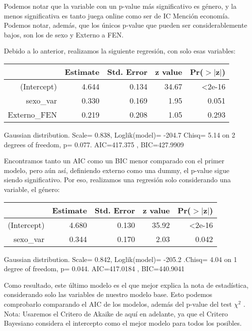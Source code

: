 \documentclass[11pt]{article}
\begin{document}
Podemos notar que la variable con un p-value más significativo es género, y la menos significativa es tanto juega online como ser de IC Mención economía. Podemos notar, además, que los únicos p-value que pueden ser considerablemente bajos, son los de sexo y Externo a FEN.

Debido a lo anterior, realizamos la siguiente regresión, con solo esas variables:

\begin{center}
\begin{table}[ht]
\centering
\begin{tabular}{rrrrr}
 \hline
& Estimate & Std. Error & z value & Pr($>$$|$z$|$) \\
 \hline
(Intercept)  & 4.644      & 0.134  & 34.67  &<2e-16\\ 
    sexo\_var &   0.330 & 0.169 & 1.95 & 0.051\\
    Externo\_FEN & 0.219  & 0.208 & 1.05 & 0.293\\
 
    \hline
   \end{tabular}
   \end{table}
\tiny{Gaussian distribution. Scale= 0.838, Loglik(model)= -204.7 Chisq= 5.14 on 2 degrees of freedom, p= 0.077. AIC=417.375 , BIC=427.9909}
\end{center}  

Encontramos tanto un AIC como un BIC menor comparado con el primer modelo, pero aún así, definiendo externo como una dummy, el p-value sigue siendo significativo. Por eso, realizamos una regresión solo considerando una variable, el género:

\begin{center}
\begin{table}[ht]
\centering
\begin{tabular}{rrrrr}
 \hline
& Estimate & Std. Error & z value & Pr($>$$|$z$|$) \\
 \hline
(Intercept)  & 4.680      & 0.130  & 35.92  &<2e-16\\ 
    sexo\_var &   0.344 & 0.170 & 2.03 & 0.042\\
               
    \hline
   \end{tabular}
   \end{table}
\tiny{Gaussian distribution. Scale= 0.842, Loglik(model)= -205.2 .Chisq= 4.04 on 1 degree of freedom, p= 0.044. AIC=417.0184 , BIC=440.9041}
\end{center}   

Como resultado, este último modelo es el que mejor explica la nota de estadística, considerando solo las variables de nuestro modelo base. Esto podemos comprobarlo comparando el AIC de los modelos, además del p-value del test \(\chi^2\) . 
Nota: Usaremos el Critero de Akaike de aquí en adelante, ya que el Critero Bayesiano considera el intercepto como el mejor modelo para todos los posibles.
\end{document}
